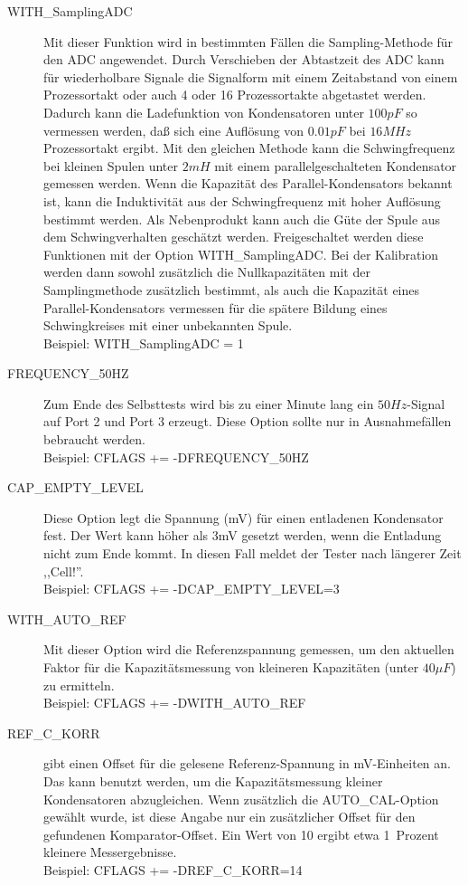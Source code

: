 \begin{description}
  \item[WITH\_SamplingADC] Mit dieser Funktion wird in bestimmten Fällen die Sampling-Methode für den ADC angewendet.
Durch Verschieben der Abtastzeit des ADC kann für wiederholbare Signale die Signalform mit einem Zeitabstand
von einem Prozessortakt oder auch 4 oder 16 Prozessortakte abgetastet werden. Dadurch kann die Ladefunktion von
Kondensatoren unter \(100pF\) so vermessen werden, daß sich eine Auflösung von \(0.01pF\) bei \(16MHz\) Prozessortakt ergibt.
Mit den gleichen Methode kann die Schwingfrequenz bei kleinen Spulen unter \(2mH\) mit einem parallelgeschalteten
Kondensator gemessen werden. Wenn die Kapazität des Parallel-Kondensators bekannt ist, kann die Induktivität aus
der Schwingfrequenz mit hoher Auflösung bestimmt werden. Als Nebenprodukt kann auch die Güte der Spule aus dem
Schwingverhalten geschätzt werden. Freigeschaltet werden diese Funktionen mit der Option WITH\_SamplingADC.
Bei der Kalibration werden dann sowohl zusätzlich die Nullkapazitäten mit der Samplingmethode zusätzlich bestimmt,
als auch die Kapazität eines Parallel-Kondensators vermessen für die spätere Bildung eines Schwingkreises mit einer unbekannten Spule.\\
Beispiel: WITH\_SamplingADC = 1

  \item[FREQUENCY\_50HZ] Zum Ende des Selbsttests wird bis zu einer Minute lang ein \(50Hz\)-Signal auf Port 2 und Port 3 erzeugt.
Diese Option sollte nur in Ausnahmefällen bebraucht werden.\\
Beispiel: CFLAGS += -DFREQUENCY\_50HZ

  \item[CAP\_EMPTY\_LEVEL] Diese Option legt die Spannung (mV) für einen entladenen Kondensator fest.
Der Wert kann höher als 3mV gesetzt werden, wenn die Entladung nicht zum Ende kommt. In diesen Fall meldet der Tester nach längerer Zeit ,,Cell!''.\\
Beispiel: CFLAGS += -DCAP\_EMPTY\_LEVEL=3

  \item[WITH\_AUTO\_REF] Mit dieser Option wird die Referenzspannung gemessen, um den aktuellen Faktor für die Kapazitätsmessung 
von kleineren Kapazitäten (unter \(40\mu F\)) zu ermitteln.\\
Beispiel: CFLAGS += -DWITH\_AUTO\_REF

  \item[REF\_C\_KORR] gibt einen Offset für die gelesene Referenz-Spannung in mV-Einheiten an.
Das kann benutzt werden, um die Kapazitätsmessung kleiner Kondensatoren abzugleichen.
Wenn zusätzlich die AUTO\_CAL-Option gewählt wurde, ist diese Angabe nur ein zusätzlicher Offset für
den gefundenen Komparator-Offset.
Ein Wert von 10 ergibt etwa 1~Prozent kleinere Messergebnisse.\\
Beispiel: CFLAGS += -DREF\_C\_KORR=14


\end{description}
